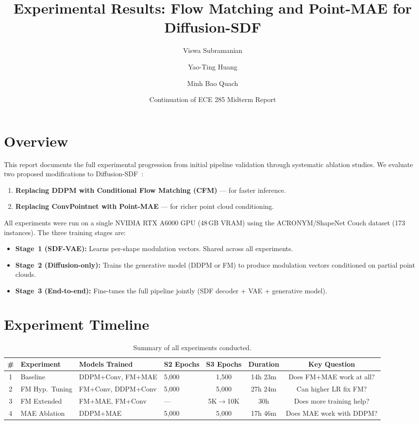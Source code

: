 \documentclass[11pt,letterpaper]{article}
\title{Experimental Results: Flow Matching and Point-MAE for Diffusion-SDF}
\author{Viswa Subramanian \and Yao-Ting Huang \and Minh Bao Quach}
\date{Continuation of ECE 285 Midterm Report}
\begin{document}
\maketitle

\section{Overview}

This report documents the full experimental progression from initial pipeline validation through systematic ablation studies. We evaluate two proposed modifications to Diffusion-SDF~\cite{chou2022diffusionsdf}:

\begin{enumerate}
    \item \textbf{Replacing DDPM with Conditional Flow Matching (CFM)} --- for faster inference.
    \item \textbf{Replacing ConvPointnet with Point-MAE} --- for richer point cloud conditioning.
\end{enumerate}

All experiments were run on a single NVIDIA RTX A6000 GPU (48\,GB VRAM) using the ACRONYM/ShapeNet Couch dataset (173 instances). The three training stages are:

\begin{itemize}
    \item \textbf{Stage~1 (SDF-VAE):} Learns per-shape modulation vectors. Shared across all experiments.
    \item \textbf{Stage~2 (Diffusion-only):} Trains the generative model (DDPM or FM) to produce modulation vectors conditioned on partial point clouds.
    \item \textbf{Stage~3 (End-to-end):} Fine-tunes the full pipeline jointly (SDF decoder + VAE + generative model).
\end{itemize}

\section{Experiment Timeline}

\begin{table}[H]
\centering
\caption{Summary of all experiments conducted.}
\label{tab:timeline}
\begin{tabular}{clllccc}
\toprule
\# & Experiment & Models Trained & S2 Epochs & S3 Epochs & Duration & Key Question \\
\midrule
1 & Baseline & DDPM+Conv, FM+MAE & 5{,}000 & 1{,}500 & 14h 23m & Does FM+MAE work at all? \\
2 & FM Hyp.\ Tuning & FM+Conv, DDPM+Conv & 5{,}000 & 5{,}000 & 27h 24m & Can higher LR fix FM? \\
3 & FM Extended & FM+MAE, FM+Conv & --- & 5K$\to$10K & 30h & Does more training help? \\
4 & MAE Ablation & DDPM+MAE & 5{,}000 & 5{,}000 & 17h 46m & Does MAE work with DDPM? \\
\bottomrule
\end{tabular}
\end{table}
\end{document}
